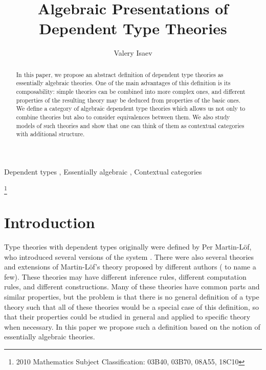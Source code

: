 \documentclass{elsarticle}
\theoremstyle{definition}
\theoremstyle{remark}
\numberwithin{figure}{section}
\begin{document}
\title{Algebraic Presentations of Dependent Type Theories}

\author[add1]{Valery Isaev}
\address[add1]{Department of Mathematics and Information Technology, Saint Petersburg Academic University, 194021 Saint Petersburg, Russian Federation}

\begin{abstract}
In this paper, we propose an abstract definition of dependent type theories as essentially algebraic theories.
One of the main advantages of this definition is its composability: simple theories can be combined into more complex ones,
and different properties of the resulting theory may be deduced from properties of the basic ones.
We define a category of algebraic dependent type theories which allows us not only to combine theories but also to consider equivalences between them.
We also study models of such theories and show that one can think of them as contextual categories with additional structure.
\end{abstract}

\begin{keyword}
Dependent types \sep
Essentially algebraic \sep
Contextual categories
\end{keyword}

\maketitle

 \makeatletter
    \providecommand\@dotsep{5}
  \makeatother

\let\thefootnote\relax\footnote{2010 Mathematics Subject Classification: 03B40, 03B70, 08A55, 18C10}

\section{Introduction}

Type theories with dependent types originally were defined by Per Martin-L\"{o}f, who introduced several versions of the system \cite{MLTT72,MLTT73,MLTT79}.
There were also several theories and extensions of Martin-L\"{o}f's theory proposed by different authors (\cite{CoC,luo94} to name a few).
These theories may have different inference rules, different computation rules, and different constructions.
Many of these theories have common parts and similar properties,
but the problem is that there is no general definition of a type theory such that all of these theories would be a special case of this definition,
so that their properties could be studied in general and applied to specific theory when necessary.
In this paper we propose such a definition based on the notion of essentially algebraic theories.
\end{document}

